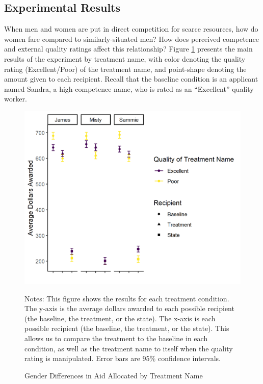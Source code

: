 \documentclass[12pt]{article}%
\begin{document}
\begin{doublespace}
\section*{Experimental Results}
When men and women are put in direct competition for scarce resources, how do women fare compared to similarly-situated men? How does perceived competence and external quality ratings affect this relationship? Figure \ref{results-main} presents the main results of the experiment by treatment name, with color denoting the quality rating (Excellent/Poor) of the treatment name, and point-shape denoting the amount given to each recipient. Recall that the baseline condition is an applicant named Sandra, a high-competence name, who is rated as an ``Excellent” quality worker.

\begin{figure}[h!]
	\centering
	\includegraphics[scale=.8]{figs/general-results-name.png}
	{\singlespacing
		\parbox{0.75\textwidth}{\scriptsize%
			Notes: This figure shows the results for each treatment condition. The y-axis is the average dollars awarded to each possible recipient (the baseline, the treatment, or the state). The x-axis is each possible recipient (the baseline, the treatment, or the state). This allows us to compare the treatment to the baseline in each condition, as well as the treatment name to itself when the quality rating is manipulated. Error bars are 95\% confidence intervals.
	}}
	\caption{Gender Differences in Aid Allocated by Treatment Name}
	\label{results-main}
\end{figure}


\end{doublespace}
\end{document}
